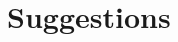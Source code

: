\documentclass[a4paper,12pt]{article}
\begin{document}
                                                                                                                                                                                                                                                                                                                                                                                                                                                                                                                                                                                                                                                                                                                                                                                                                                                                                                                                                                                                                                                                                                                                                                                                                                                                                                                                                                                                                                                                                                                                                                                                                                                                                                                                                                                                                                                                                                                                                                                                                                                                                                                                                                                                                                                                            \section{Suggestions}
\end{document}
